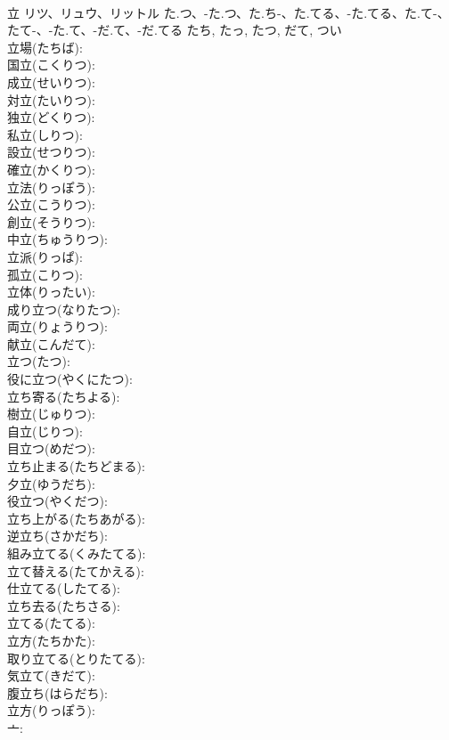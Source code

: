 \documentclass[8pt]{extreport}
\begin{document}
\begin{CJK}{UTF8}{min}
\\	立	リツ、リュウ、リットル	た.つ、-た.つ、た.ち-、た.てる、-た.てる、た.て-、たて-、-た.て、-だ.て、-だ.てる	たち, たっ, たつ, だて, つい	
\\	立場(たちば): 
\\	国立(こくりつ): 
\\	成立(せいりつ): 
\\	対立(たいりつ): 
\\	独立(どくりつ): 
\\	私立(しりつ): 
\\	設立(せつりつ): 
\\	確立(かくりつ): 
\\	立法(りっぽう): 
\\	公立(こうりつ): 
\\	創立(そうりつ): 
\\	中立(ちゅうりつ): 
\\	立派(りっぱ): 
\\	孤立(こりつ): 
\\	立体(りったい): 
\\	成り立つ(なりたつ): 
\\	両立(りょうりつ): 
\\	献立(こんだて): 
\\	立つ(たつ): 
\\	役に立つ(やくにたつ): 
\\	立ち寄る(たちよる): 
\\	樹立(じゅりつ): 
\\	自立(じりつ): 
\\	目立つ(めだつ): 
\\	立ち止まる(たちどまる): 
\\	夕立(ゆうだち): 
\\	役立つ(やくだつ): 
\\	立ち上がる(たちあがる): 
\\	逆立ち(さかだち): 
\\	組み立てる(くみたてる): 
\\	立て替える(たてかえる): 
\\	仕立てる(したてる): 
\\	立ち去る(たちさる): 
\\	立てる(たてる): 
\\	立方(たちかた): 
\\	取り立てる(とりたてる): 
\\	気立て(きだて): 
\\	腹立ち(はらだち): 
\\	立方(りっぽう): 
\\	亠: 

\end{CJK}
\end{document}
